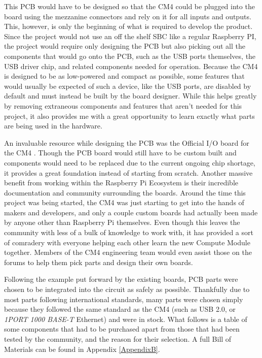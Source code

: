 This PCB would have to be designed so that the CM4 could be plugged into the board using the mezzanine connectors and rely on it for all inputs and outputs.
This, however, is only the beginning of what is required to develop the product.
Since the project would not use an off the shelf SBC like a regular Raspberry PI, the project would require only designing the PCB but also picking out all the components that would go onto the PCB, such as the USB ports themselves, the USB driver chip, and related components needed for operation.
Because the CM4 is designed to be as low-powered and compact as possible, some features that would usually be expected of such a device, like the USB ports, are disabled by default and must instead be built by the board designer.
While this helps greatly by removing extraneous components and features that aren't needed for this project, it also provides me with a great opportunity to learn exactly what parts are being used in the hardware.

An invaluable resource while designing the PCB was the Official I/O board for the CM4 \cite{rpi_cm4_io}.
Though the PCB board would still have to be custom built and components would need to be replaced due to the current ongoing chip shortage, it provides a great foundation instead of starting from scratch.
Another massive benefit from working within the Raspberry Pi Ecosystem is their incredible documentation and community surrounding the boards.
Around the time this project was being started, the CM4 was just starting to get into the hands of makers and developers, and only a couple custom boards had actually been made by anyone other than Raspberry Pi themselves.
Even though this leaves the community with less of a bulk of knowledge to work with, it has provided a sort of comradery with everyone helping each other learn the new Compute Module together.
Members of the CM4 engineering team would even assist those on the forums to help them pick parts and design their own boards.

Following the example put forward by the existing boards, PCB parts were chosen to be integrated into the circuit as safely as possible.
Thankfully due to most parts following international standards, many parts were chosen simply because they followed the same standard as the CM4 (such as USB 2.0, or \emph{1PORT 1000 BASE-T} Ethernet) and were in stock.
What follows is a table of some components that had to be purchased apart from those that had been tested by the community, and the reason for their selection.
A full Bill of Materials can be found in Appendix \ref{AppendixB}.

